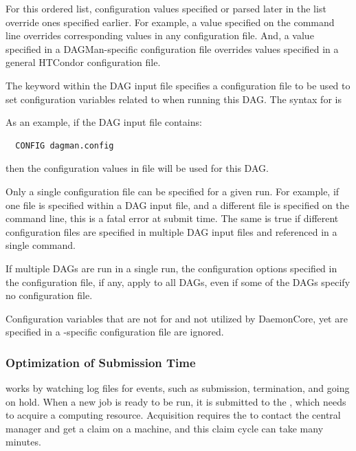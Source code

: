 For this ordered list, 
configuration values specified or parsed later in the list
override ones specified earlier.
For example, a value specified on the
 command line overrides corresponding values in any
configuration file.
And, a value specified in a DAGMan-specific configuration
file overrides values specified in a general HTCondor configuration file.

The  keyword within the DAG input file specifies a 
configuration file to be used to set configuration variables 
related to  when running this DAG.
The syntax for  is

 

As an example, if the DAG input file contains:
\begin{verbatim}
  CONFIG dagman.config
\end{verbatim}
then the configuration values in file  will be used
for this DAG.

Only a single configuration file can be specified for a given
 run.  For example, if one file is specified within a DAG
input file,
and a different file is specified on the  command
line, this is a fatal error at submit time.
The same is true if
different configuration files are specified in multiple DAG input files
and referenced in a single  command.

If multiple DAGs are run in a single  run, 
the configuration options specified in the  configuration
file, if any, apply to all DAGs, even if some of the DAGs specify no
configuration file.

Configuration variables that are not for 
and not utilized by DaemonCore, yet are specified in a
-specific configuration file are ignored.

\subsubsection{\label{sec:MultipleDAGs}Optimization of Submission Time}

 works by watching log files for events, such as submission,
termination, and going on hold.
When a new job is ready to be run, it is submitted to the , 
which needs to acquire a computing resource. 
Acquisition requires the  to contact the central
manager and get a claim on a machine,
and this claim cycle can take many minutes.

